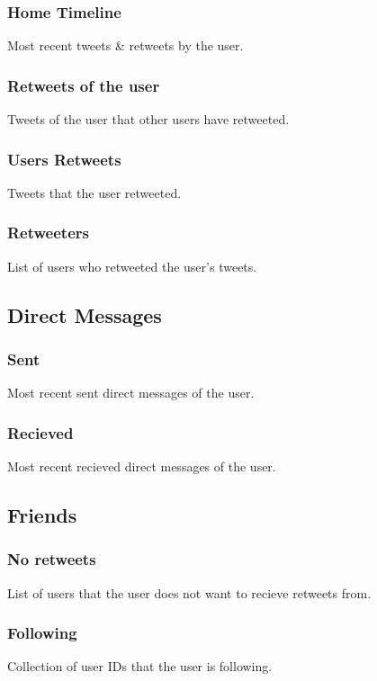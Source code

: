 \documentclass{article}
\begin{document}
		\subsubsection{Home Timeline}
			Most recent tweets \& retweets by the user.

		\subsubsection{Retweets of the user}
			Tweets of the user that other users have retweeted.

		\subsubsection{Users Retweets}
			Tweets that the user retweeted.

		\subsubsection{Retweeters}
			List of users who retweeted the user's tweets.

	\subsection{Direct Messages}
		\subsubsection{Sent}
			Most recent sent direct messages of the user.

		\subsubsection{Recieved}
			Most recent recieved direct messages of the user.

	\subsection{Friends}
		\subsubsection{No retweets}
			List of users that the user does not want to recieve retweets from.

		\subsubsection{Following}
			Collection of user IDs that the user is following.
\end{document}
